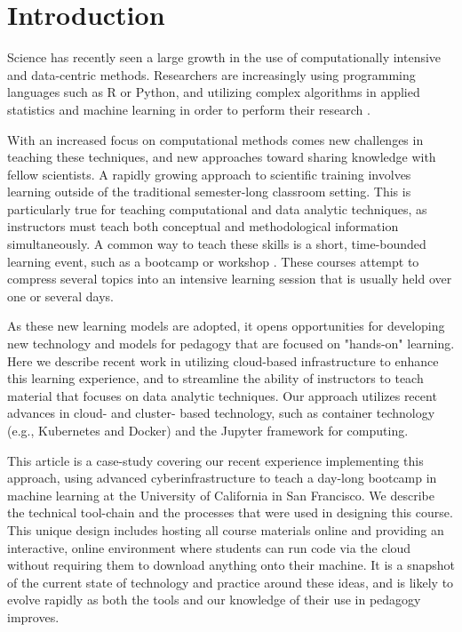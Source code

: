 \section{Introduction}

Science has recently seen a large growth in the use of
computationally intensive and data-centric methods. Researchers are
increasingly using programming languages such as R or Python, and utilizing
complex algorithms in applied statistics and machine learning in order to
perform their research \cite{momcheva2015astro}.

With an increased focus on computational methods
comes new challenges in teaching these techniques, and new approaches
toward sharing knowledge with fellow scientists.
A rapidly growing approach to scientific training involves learning
outside of the traditional semester-long classroom setting.
This is particularly true
for teaching computational and data analytic techniques,
as instructors must teach both conceptual and methodological information
simultaneously. A common way to teach these skills is a short,
time-bounded learning event, such as a bootcamp or workshop
\cite{wilson2016software}. These  courses attempt to compress several
topics into an intensive learning session that is usually held over one or
several days.

As these new learning models are adopted, it opens
opportunities for developing new technology and models for pedagogy that are
focused on "hands-on" learning. Here we describe
recent work in utilizing cloud-based infrastructure to enhance this learning
experience, and to streamline the ability of instructors to
teach material that focuses on data analytic techniques. Our approach
utilizes recent advances in cloud- and cluster- based technology, such
as container technology (e.g., Kubernetes and Docker) and the
Jupyter framework for computing. 

This article is a case-study covering our recent experience implementing this approach, using
advanced cyberinfrastructure to teach a day-long bootcamp in machine learning at
the University of California in San Francisco.
We describe the technical tool-chain and the processes that were used in
designing this course. This
unique design includes hosting all course materials online and providing
an interactive, online environment where students can run code via the cloud
without requiring them to download anything onto their machine.
It is a snapshot of the current state
of technology and practice around these ideas, and is likely to evolve rapidly
as both the tools and our knowledge of their use in pedagogy improves.

